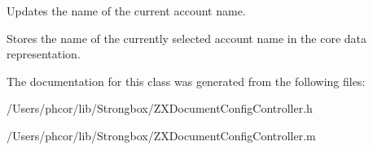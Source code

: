 Updates the name of the current account name. 

Stores the name of the currently selected account name in the core data representation. 

The documentation for this class was generated from the following files:\begin{CompactItemize}
\item 
/Users/phcor/lib/Strongbox/ZXDocumentConfigController.h\item 
/Users/phcor/lib/Strongbox/ZXDocumentConfigController.m\end{CompactItemize}
